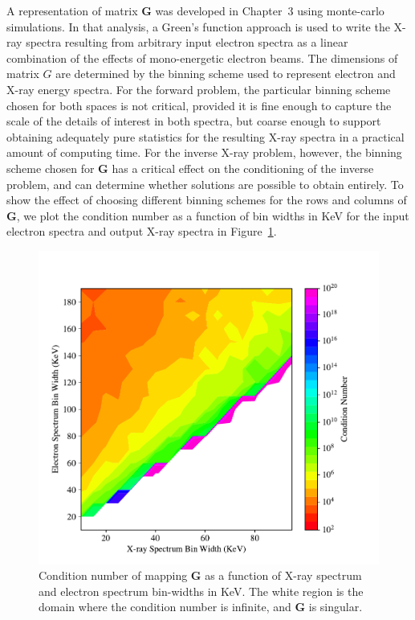 A representation of matrix $\mathbf{G}$ was developed in Chapter~3 using monte-carlo simulations. In that analysis, a Green's function approach is used to write the X-ray spectra resulting from arbitrary input electron spectra as a linear combination of the effects of mono-energetic electron beams. The dimensions of matrix $G$ are determined by the binning scheme used to represent electron and X-ray energy spectra. For the forward problem, the particular binning scheme chosen for both spaces is not critical, provided it is fine enough to capture the scale of the details of interest in both spectra, but coarse enough to support obtaining adequately pure statistics for the resulting X-ray spectra in a practical amount of computing time. For the inverse X-ray problem, however, the binning scheme chosen for $\mathbf{G}$ has a critical effect on the conditioning of the inverse problem, and can determine whether solutions are possible to obtain entirely. To show the effect of choosing different binning schemes for the rows and columns of $\mathbf{G}$, we plot the condition number as a function of bin widths in KeV for the input electron spectra and output X-ray spectra in Figure~\ref{condition_number_binning}. 

\begin{figure}[p]
\label{condition_number_binning}
\centering
\includegraphics[width=1.0\textwidth]{figures/chapter_4/condition_number_binning/condition_number_binning.pdf}
\caption{Condition number of mapping $\mathbf{G}$ as a function of X-ray spectrum and electron spectrum bin-widths in KeV. The white region is the domain where the condition number is infinite, and $\mathbf{G}$ is singular.}
\end{figure}

